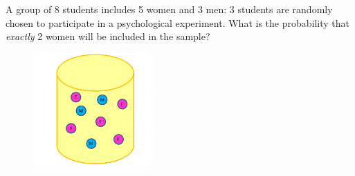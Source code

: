 \documentclass[smaller, handout]{beamer}\usepackage[]{graphicx}\usepackage[]{color}
\begin{document}
\begin{frame}{\secname}%


\begin{example}
A group of 8 students includes 5 women and 3 men: 3 students are randomly chosen to participate in a psychological
experiment. What is the probability that \emph{exactly} 2 women will be included
in the sample?%
\begin{figure}[ptb]\centering
\includegraphics[width=0.4\textwidth]{img/URNpic_2.pdf}
\end{figure}%
\end{example}

\end{frame}%
\end{document}
